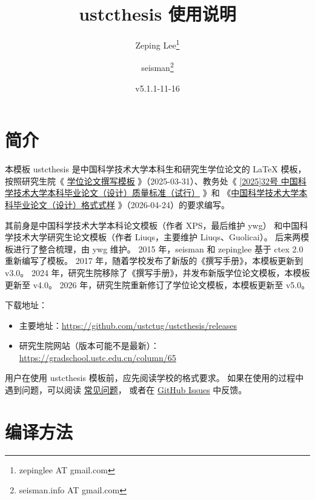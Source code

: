 \documentclass[a4paper]{ltxdoc}
\DeclareRobustCommand\pkg{\textsf}
\DeclareRobustCommand\cls{\textsf}
\begin{document}
\title{\cls{ustcthesis} 使用说明}
\author{Zeping Lee\thanks{zepinglee AT gmail.com} \and
        seisman\thanks{seisman.info AT gmail.com} }
\date{v5.1.1-11-16}
\maketitle



\section{简介}

本模板 \cls{ustcthesis} 是中国科学技术大学本科生和研究生学位论文的 \LaTeX{}
模板， 按照研究生院《
\href{https://gradschool.ustc.edu.cn/column/65}{学位论文撰写模板}
》（2025-03-31）、教务处《
\href{https://www.teach.ustc.edu.cn/?attachment_id=19501}
  {[2025]32号 中国科学技术大学本科毕业论文（设计）质量标准（试行）}
》和
《\href{https://www.teach.ustc.edu.cn/?attachment_id=13867}
  {中国科学技术大学本科毕业论文（设计）格式式样}
》（2026-04-24）的要求编写。

其前身是中国科学技术大学本科论文模板（作者 XPS，最后维护 ywg）
和中国科学技术大学研究生论文模板（作者 Liuqs，主要维护 Liuqs、Guolicai）。
后来两模板进行了整合梳理，由 ywg 维护。
2015 年，seisman 和 zepinglee 基于 \pkg{ctex} 2.0 重新编写了模板。
2017 年，随着学校发布了新版的《撰写手册》，本模板更新到 v3.0。
2024 年，研究生院移除了《撰写手册》，并发布新版学位论文模板，本模板更新至 v4.0。
2026 年，研究生院重新修订了学位论文模板，本模板更新至 v5.0。

下载地址：
\begin{itemize}
  \item 主要地址：\url{https://github.com/ustctug/ustcthesis/releases}
  \item 研究生院网站（版本可能不是最新）：
    \url{https://gradschool.ustc.edu.cn/column/65}
\end{itemize}

用户在使用 \pkg{ustcthesis} 模板前，应先阅读学校的格式要求。
如果在使用的过程中遇到问题，可以阅读
\href{https://github.com/ustctug/ustcthesis/wiki}{常见问题}，
或者在 \href{https://github.com/ustctug/ustcthesis/issues}{GitHub Issues}
中反馈。



\section{编译方法}
\end{document}
